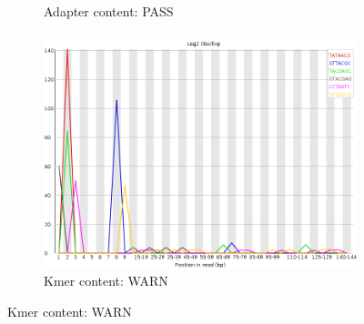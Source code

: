 \documentclass{article}
\begin{document}
\begin{figure}[htbp]
\begin{subfigure}{0.45\linewidth}
\caption{Adapter content: PASS}
\end{subfigure}
\begin{subfigure}{0.45\linewidth}
\includegraphics[width=\linewidth]{04-R1.qfilter_fastqc/Images/kmer_profiles.png}
\caption{Kmer content: WARN}
\end{subfigure}
\end{figure}
\end{document}
